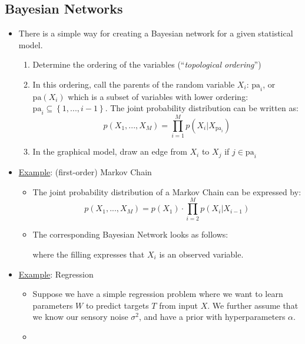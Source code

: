 \subsection{Bayesian Networks}
\begin{itemize}
	\item There is a simple way for creating a Bayesian network for a given statistical model.
	\begin{enumerate}
		\item Determine the ordering of the variables (``\textit{topological ordering}'')
		\item In this ordering, call the parents of the random variable $X_i$: $\text{pa}_i$, or $\text{pa}(X_i)$ which is a subset of variables with lower ordering: $\text{pa}_i \subseteq \left\{1,...,i-1\right\}$. The joint probability distribution can be written as:
		$$p(X_1,...,X_M) = \prod_{i=1}^{M}p(X_i|X_{\text{pa}_i})$$
		\item In the graphical model, draw an edge from $X_i$ to $X_j$ if $j\in \text{pa}_i$
	\end{enumerate}
	\item \underline{Example}: (first-order) Markov Chain
	\begin{itemize}
		\item The joint probability distribution of a Markov Chain can be expressed by:
		$$p(X_1,...,X_M)=p(X_1)\cdot \prod_{i=2}^{M} p(X_i|X_{i-1})$$
		\item The corresponding Bayesian Network looks as follows:
		\begin{figure}[ht!]
			\centering
		\end{figure}
	
		where the filling expresses that $X_i$ is an observed variable.
	\end{itemize}
	\item \underline{Example}: Regression
	\begin{itemize}
		\item Suppose we have a simple regression problem where we want to learn parameters $W$ to predict targets $T$ from input $X$. We further assume that we know our sensory noise $\sigma^2$, and have a prior with hyperparameters $\alpha$.
		\item 
		\begin{figure}[ht!]
			\centering
\end{figure}
\end{itemize}
\end{itemize}
